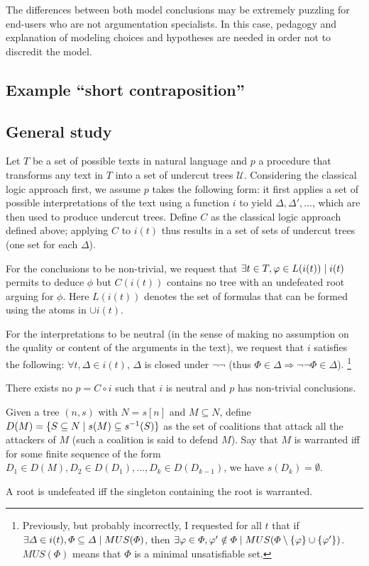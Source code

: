 \documentclass[version=3.21, pagesize, twoside=off, bibliography=totoc, DIV=calc, fontsize=12pt, a4paper, french, english]{scrartcl}
\begin{document}
The differences between both model conclusions may be extremely puzzling for end-users who are not argumentation specialists. In this case, pedagogy and explanation of modeling choices and hypotheses are needed in order not to discredit the model.

\subsection{Example “short contraposition”}

\subsection{General study}
Let $T$ be a set of possible texts in natural language and $p$ a procedure that transforms any text in $T$ into a set of undercut trees $\mathcal{U}$. Considering the classical logic approach first, we assume $p$ takes the following form: it first applies a set of possible interpretations of the text using a function $i$ to yield $\Delta, \Delta', …$, which are then used to produce undercut trees. Define $C$ as the classical logic approach defined above; applying $C$ to $i(t)$ thus results in a set of sets of undercut trees (one set for each $\Delta$).

For the conclusions to be non-trivial, we request that $\exists t \in T, \phi \in L(i(t)) \suchthat i(t) $ permits to deduce $\phi$ but $C(i(t))$ contains no tree with an undefeated root arguing for $\phi$. Here $L(i(t))$ denotes the set of formulas that can be formed using the atoms in $\cup i(t)$.

For the interpretations to be neutral (in the sense of making no assumption on the quality or content of the arguments in the text), we request that $i$ satisfies the following: $\forall t, \Delta \in i(t)$, $\Delta$ is closed under $¬¬$ (thus $\Phi \in \Delta ⇒ ¬¬\Phi \in \Delta$).
\footnote{Previously, but probably incorrectly, I requested for all $t$ that if $\exists \Delta \in i(t), \Phi \subseteq \Delta \suchthat MUS(\Phi)$, then $\exists \phi \in \Phi, \phi' \notin \Phi \suchthat MUS(\Phi \setminus \set{\phi} \cup \set{\phi'})$. $MUS(\Phi)$ means that $\Phi$ is a minimal unsatisfiable set.}

\begin{theorem}
	There exists no $p = C \circ i$ such that $i$ is neutral and $p$ has non-trivial conclusions.
\end{theorem}
Given a tree $(n, s)$ with $N = s[n]$ and $M \subseteq N$, define $D(M) = \set{S \subseteq N \suchthat s(M) \subseteq s^{-1}(S)}$ as the set of coalitions that attack all the attackers of $M$ (such a coalition is said to defend $M$). Say that $M$ is warranted iff for some finite sequence of the form $D_1 \in D(M), D_2 \in D(D_1), …, D_k \in D(D_{k - 1})$, we have $s(D_k) = \emptyset$.
\begin{lemma}
	A root is undefeated iff the singleton containing the root is warranted.
\end{lemma}
\end{document}

